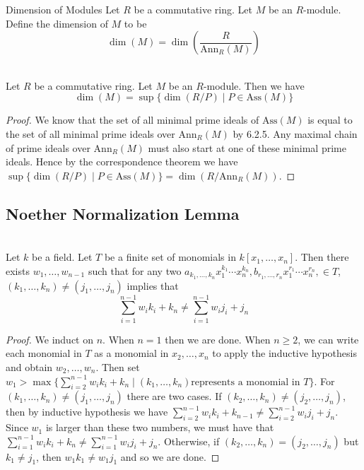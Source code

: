 \documentclass[a4paper]{article}
\begin{document}
\begin{defn}{Dimension of Modules}{} Let $R$ be a commutative ring. Let $M$ be an $R$-module. Define the dimension of $M$ to be $$\dim(M)=\dim\left(\frac{R}{\text{Ann}_R(M)}\right)$$
\end{defn}

\begin{prp}{}{}\\
Let $R$ be a commutative ring. Let $M$ be an $R$-module. Then we have $$\dim(M)=\sup\{\dim(R/P)\;|\;P\in\text{Ass}(M)\}$$
\begin{proof}
We know that the set of all minimal prime ideals of $\text{Ass}(M)$ is equal to the set of all minimal prime ideals over $\text{Ann}_R(M)$ by 6.2.5. Any maximal chain of prime ideals over $\text{Ann}_R(M)$ must also start at one of these minimal prime ideals. Hence by the correspondence theorem we have $\sup\{\dim(R/P)\;|\;P\in\text{Ass}(M)\}=\dim(R/\text{Ann}_R(M))$. 
\end{proof}
\end{prp}

\subsection{Noether Normalization Lemma}
\begin{lmm}{}{}\\
Let $k$ be a field. Let $T$ be a finite set of monomials in $k[x_1,\dots,x_n]$. Then there exists $w_1,\dots,w_{n-1}$ such that for any two $a_{k_1,\dots,k_n}x_1^{k_1}\cdots x_n^{k_n},b_{r_1,\dots,r_n}x_1^{r_1}\cdots x_n^{r_n},\in T$, $(k_1,\dots,k_n)\neq(j_1,\dots,j_n)$ implies that $$\sum_{i=1}^{n-1}w_ik_i+k_n\neq\sum_{i=1}^{n-1}w_ij_i+j_n$$
\begin{proof}
We induct on $n$. When $n=1$ then we are done. When $n\geq 2$, we can write each monomial in $T$ as a monomial in $x_2,\dots,x_n$ to apply the inductive hypothesis and obtain $w_2,\dots,w_n$. Then set $w_1>\max\{\sum_{i=2}^{n-1}w_ik_i+k_n\;|\;(k_1,\dots,k_n)\text{represents a monomial in }T\}$. For $(k_1,\dots,k_n)\neq(j_1,\dots,j_n)$ there are two cases. If $(k_2,\dots,k_n)\neq(j_2,\dots,j_n)$, then by inductive hypothesis we have $\sum_{i=2}^{n-1}w_ik_i+k_{n-1}\neq\sum_{i=2}^{n-1}w_ij_i+j_n$. Since $w_1$ is larger than these two numbers, we must have that $\sum_{i=1}^{n-1}w_ik_i+k_n\neq\sum_{i=1}^{n-1}w_ij_i+j_n$. Otherwise, if $(k_2,\dots,k_n)=(j_2,\dots,j_n)$ but $k_1\neq j_1$, then $w_1k_1\neq w_1j_1$ and so we are done. 
\end{proof}
\end{lmm}
\end{document}

